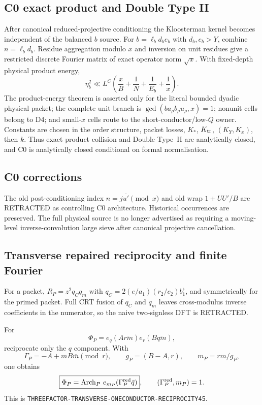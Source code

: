 \documentclass[11pt]{article}
\theoremstyle{definition}
\newcommand{\1}{\mathbf 1}
\newcommand{\status}[1]{\textsf{#1}}
\begin{document}
\subsection{C0 exact product and Double Type II}
After canonical reduced-projective conditioning the Kloosterman kernel becomes independent
of the balanced $b$ source. For $b=\ell_b d_b e_b$ with $d_b,e_b>Y$, combine
$n=\ell_b d_b$. Residue aggregation modulo $x$ and inversion on unit residues give a
restricted discrete Fourier matrix of exact operator norm $\sqrt{x}$. With fixed-depth
physical product energy,
\[
\boxed{\eta_b^2\ll L^C\left(\frac{x}{B}+\frac1N+\frac1{E_b}+\frac1x\right)}.
\]
The product-energy theorem is asserted only for the literal bounded dyadic physical packet;
the complete unit branch is $\gcd(b a_\rho b_\rho u_\rho,x)=1$; nonunit cells belong to D4;
and small-$x$ cells route to the short-conductor/low-$Q$ owner. Constants are chosen in the
order structure, packet losses, $K_*$, $K_{\rm tr}$, $(K_Y,K_x)$, then $k$. Thus exact
product collision and Double Type~II are analytically closed, and C0 is analytically closed
conditional on formal normalisation.

\subsection{C0 corrections}
The old post-conditioning index $n=j\overline{u'}\pmod x$ and old wrap $1+UU'/B$ are
\status{RETRACTED} as controlling C0 architecture. Historical occurrences are preserved.
The full physical source is no longer advertised as requiring a moving-level
inverse-convolution large sieve after canonical projective cancellation.

\subsection{Transverse repaired reciprocity and finite Fourier}
For a packet, $R_P=z^2q_Cq_m$ with
$q_C=2(e/a_1)(r_2/c_2)b_1^\flat$, and symmetrically for the primed packet. Full CRT fusion of
$q_C$ and $q_m$ leaves cross-modulus inverse coefficients in the numerator, so the naive
two-signless DFT is \status{RETRACTED}.

For
\[
\Phi_P=e_q(A\overline{rm})e_r(B\overline{qm}),
\]
reciprocate only the $q$ component. With
\[
\Gamma_P=-A+mB\overline m\pmod r,\qquad g_P=(B-A,r),\qquad m_P=rm/g_P,
\]
one obtains
\[
\boxed{\Phi_P=\operatorname{Arch}_P\,e_{m_P}(\Gamma_P^{\rm red}\bar q)},\qquad
(\Gamma_P^{\rm red},m_P)=1.
\]
This is \texttt{THREEFACTOR-TRANSVERSE-ONECONDUCTOR-RECIPROCITY45}.
\end{document}
